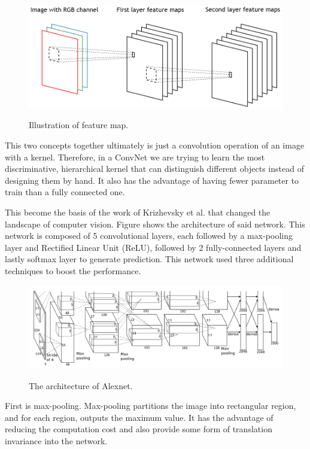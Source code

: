 \documentclass[a4paper,11pt]{kth-mag}
\begin{document}
\begin{figure}[h]
\centering
\includegraphics[scale=0.5]{image/feature_map.png}
\label{fig:feature_map}
\caption{Illustration of feature map.}
\end{figure}

This two concepts together ultimately is just a convolution operation of an image with a kernel. Therefore, in a ConvNet we are trying to learn the most discriminative, hierarchical kernel that can distinguish different objects instead of designing them by hand. It also has the advantage of having fewer parameter to train than a fully connected one.

This become the basis of the work of Krizhevsky et al. that changed the landscape of computer vision. Figure \label{fig:alexnet} shows the architecture of said network. This network is composed of 5 convolutional layers, each followed by a max-pooling layer and Rectified Linear Unit (ReLU), followed by 2 fully-connected layers and lastly softmax layer to generate prediction. This network used three additional techniques to boost the performance.

\begin{figure}
\centering
\includegraphics[scale=0.35]{image/alexnet.png}
\label{fig:alexnet}
\caption{The architecture of Alexnet.}
\end{figure}

First is max-pooling. Max-pooling partitions the image into rectangular region, and for each region, outputs the maximum value. It has the advantage of reducing the computation cost and also provide some form of translation invariance into the network.
\end{document}
